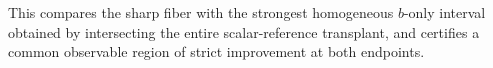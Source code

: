 This compares the sharp fiber with the strongest homogeneous \(b\)-only interval obtained by intersecting the entire scalar-reference transplant, and certifies a common observable region of strict improvement at both endpoints.